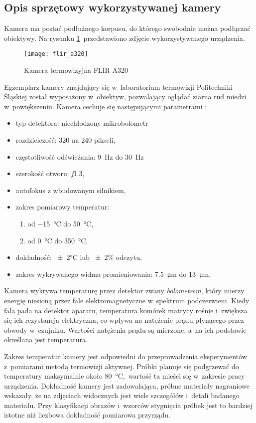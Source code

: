 \subsection{Opis sprzętowy wykorzystywanej kamery}
Kamera ma postać podłużnego korpusu, do którego swobodnie można podłączać
obiektywy.
Na rysunku \ref{fig:camera}~przedstawiono zdjęcie wykorzystywanego urządzenia.
\begin{figure}[htb]
    \centering
    \texttt{[image: flir\_a320]}
    \caption{Kamera termowizyjna FLIR A320}
    \label{fig:camera}
\end{figure}
Egzemplarz kamery znajdujący się w~laboratorium termowizji Politechniki
Śląskiej został wyposażony w~obiektyw, pozwalający oglądać ziarna rud miedzi
w~powiększeniu.
Kamera cechuje się następującymi parametrami \cite{flir_camera_specs}:
\begin{itemize}
	\item typ detektora: niechłodzony mikrobolometr
	\item rozdzielczość: 320 na 240 pikseli,
	\item częstotliwość odświeżania: \SI{9}{\hertz} do \SI{30}{\hertz}
	\item szerokość otworu: \textit{f}\num{1,3},
	\item autofokus z wbudowanym silnikiem,
	\item zakres pomiarowy temperatur: 
		\begin{enumerate}
			\item od \SI{-15}{\celsius} do \SI{+50}{\celsius},
			\item od \SI{0}{\celsius} do \SI{350}{\celsius},
		\end{enumerate}
	\item dokładność: \num{\pm2}\si{\celsius} lub \num{\pm2}\% odczytu,
	\item zakres wykrywanego widma promieniowania: \SI{7,5}{\micro\meter}
          do \SI{13}{\micro\meter}.
\end{itemize}

Kamera wykrywa temperaturę przez detektor zwany \emph{bolometrem},
który mierzy energię niesioną przez fale elektromagnetyczne w~spektrum
podczerwieni.
Kiedy fala pada na detektor aparatu, temperatura komórek matrycy rośnie
i~zwiększa się ich rezystancja elektryczna, co wpływa na natężenie prądu
płynącego przez obwody w~czujniku.
Wartości natężenia prądu są mierzone, a~na ich podstawie określana jest
temperatura.

Zakres temperatur kamery jest odpowiedni do przeprowadzenia eksperymentów
z~pomiarami metodą termowizji aktywnej.
Próbki planuje się podgrzewać do temperatury maksymalnie około
\SI{80}{\celsius},~wartość ta mieści się w~zakresie pracy urządzenia.
Dokładność kamery jest zadowalająca, próbne materiały nagraniowe
wskazały, że na zdjęciach widocznych jest wiele szczegółów i~detali
badanego materiału.
Przy klasyfikacji obrazów i~wzorców stygnięcia próbek jest to 
bardziej istotne niż liczbowa dokładność pomiarowa przyrządu.

